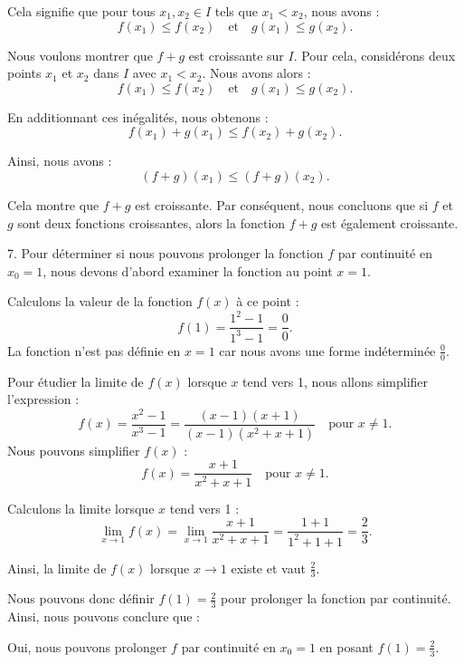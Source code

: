 \documentclass[12pt]{article}
\begin{document}
Cela signifie que pour tous \( x_1, x_2 \in I \) tels que \( x_1 < x_2 \), nous avons :
\[
f(x_1) \leq f(x_2) \quad \text{et} \quad g(x_1) \leq g(x_2).
\]

Nous voulons montrer que \( f + g \) est croissante sur \( I \). Pour cela, considérons deux points \( x_1 \) et \( x_2 \) dans \( I \) avec \( x_1 < x_2 \). Nous avons alors :
\[
f(x_1) \leq f(x_2) \quad \text{et} \quad g(x_1) \leq g(x_2).
\]

En additionnant ces inégalités, nous obtenons :
\[
f(x_1) + g(x_1) \leq f(x_2) + g(x_2).
\]

Ainsi, nous avons :
\[
(f + g)(x_1) \leq (f + g)(x_2).
\]

Cela montre que \( f + g \) est croissante. Par conséquent, nous concluons que si \( f \) et \( g \) sont deux fonctions croissantes, alors la fonction \( f + g \) est également croissante.

7. Pour déterminer si nous pouvons prolonger la fonction \( f \) par continuité en \( x_0 = 1 \), nous devons d'abord examiner la fonction au point \( x = 1 \). 

Calculons la valeur de la fonction \( f(x) \) à ce point :
\[
f(1) = \frac{1^2 - 1}{1^3 - 1} = \frac{0}{0}.
\]
La fonction n'est pas définie en \( x = 1 \) car nous avons une forme indéterminée \( \frac{0}{0} \).

Pour étudier la limite de \( f(x) \) lorsque \( x \) tend vers 1, nous allons simplifier l'expression :
\[
f(x) = \frac{x^2 - 1}{x^3 - 1} = \frac{(x - 1)(x + 1)}{(x - 1)(x^2 + x + 1)} \quad \text{pour } x \neq 1.
\]
Nous pouvons simplifier \( f(x) \) :
\[
f(x) = \frac{x + 1}{x^2 + x + 1} \quad \text{pour } x \neq 1.
\]

Calculons la limite lorsque \( x \) tend vers 1 :
\[
\lim_{x \to 1} f(x) = \lim_{x \to 1} \frac{x + 1}{x^2 + x + 1} = \frac{1 + 1}{1^2 + 1 + 1} = \frac{2}{3}.
\]

Ainsi, la limite de \( f(x) \) lorsque \( x \to 1 \) existe et vaut \( \frac{2}{3} \).

Nous pouvons donc définir \( f(1) = \frac{2}{3} \) pour prolonger la fonction par continuité. Ainsi, nous pouvons conclure que :

Oui, nous pouvons prolonger \( f \) par continuité en \( x_0 = 1 \) en posant \( f(1) = \frac{2}{3} \).
\end{document}
